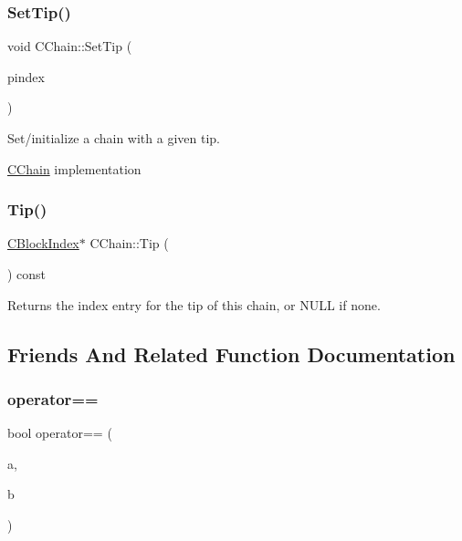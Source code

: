 \subsubsection{\texorpdfstring{Set\+Tip()}{SetTip()}}
{\footnotesize\ttfamily void C\+Chain\+::\+Set\+Tip (\begin{DoxyParamCaption}\item[{\mbox{\hyperlink{class_c_block_index}{C\+Block\+Index}} $\ast$}]{pindex }\end{DoxyParamCaption})}

Set/initialize a chain with a given tip.

\mbox{\hyperlink{class_c_chain}{C\+Chain}} implementation \mbox{\label{class_c_chain_a578545bde95163bee37b1be28e7b2755}} 
\subsubsection{\texorpdfstring{Tip()}{Tip()}}
{\footnotesize\ttfamily \mbox{\hyperlink{class_c_block_index}{C\+Block\+Index}}$\ast$ C\+Chain\+::\+Tip (\begin{DoxyParamCaption}{ }\end{DoxyParamCaption}) const\hspace{0.3cm}{\ttfamily [inline]}}

Returns the index entry for the tip of this chain, or N\+U\+LL if none. 

\subsection{Friends And Related Function Documentation}
\mbox{\label{class_c_chain_a0e46ed4192afeafb8d420b2d6d9bb24c}} 
\subsubsection{\texorpdfstring{operator==}{operator==}}
{\footnotesize\ttfamily bool operator== (\begin{DoxyParamCaption}\item[{const \mbox{\hyperlink{class_c_chain}{C\+Chain}} \&}]{a,  }\item[{const \mbox{\hyperlink{class_c_chain}{C\+Chain}} \&}]{b }\end{DoxyParamCaption})\hspace{0.3cm}{\ttfamily [friend]}}

